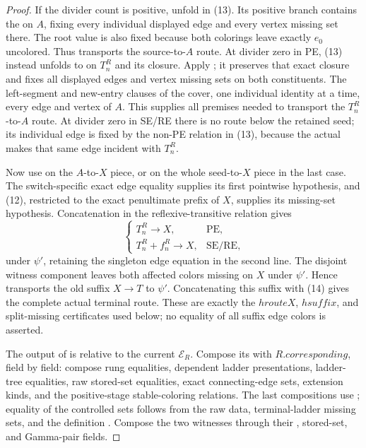 \begin{proof}
If the divider count is positive, unfold
 in (13).  Its positive branch contains
the  on \(A\), fixing every individual
displayed edge and every vertex missing set there.  The root value is
also fixed because both colorings leave exactly \(e_0\) uncolored.
Thus  transports
the source-to-\(A\) route.  At divider zero in PE, (13) instead unfolds
to  on \(T_n^R\) and its closure.
Apply ; it preserves that exact
closure and fixes all displayed edges and vertex missing sets on both
constituents.  The left-segment and new-entry clauses of the
 cover, one individual identity at a time,
every edge and vertex of \(A\).  This supplies all premises needed to
transport the \(T_n^R\)-to-\(A\) route.  At divider zero in SE/RE there is
no route below the retained seed; its individual edge is fixed by the
non-PE  relation in (13), because the
actual  makes that same edge incident with
\(T_n^R\).

Now use  on the
\(A\)-to-\(X\) piece, or on the whole seed-to-\(X\) piece in the last
case.  The switch-specific exact edge equality supplies its first
pointwise hypothesis, and (12), restricted to the exact penultimate
prefix of \(X\), supplies its missing-set hypothesis.  Concatenation in
the reflexive-transitive relation gives
\[
 \begin{cases}
 T_n^R\longrightarrow X,&\text{PE},\\
 T_n^R+f_n^R\longrightarrow X,&\text{SE/RE},
 \end{cases}                                                  \tag{14}
\]
under \(\psi'\), retaining the singleton edge equation in the second
line.  The disjoint witness component leaves both affected colors
missing on \(X\) under \(\psi'\).  Hence
 transports the old
suffix \(X\longrightarrow T\) to \(\psi'\).  Concatenating this suffix
with (14) gives the complete actual terminal route.  These are exactly
the \(hrouteX\), \(hsuffix\), and split-missing certificates used below;
no equality of all suffix edge colors is asserted.

The output of  is relative to
the current \(\mathcal E_R\).  Compose its
 with
\(R.\mathit{corresponding}\), field by field: compose rung equalities,
dependent ladder presentations, ladder-tree equalities, raw stored-set
equalities, exact connecting-edge sets, extension kinds, and the
positive-stage stable-coloring relations.  The last compositions use
; equality of the controlled sets follows from the raw data,
terminal-ladder missing sets, and the definition
.  Compose the two
 witnesses through their
, stored-set, and Gamma-pair fields.


\end{proof}
